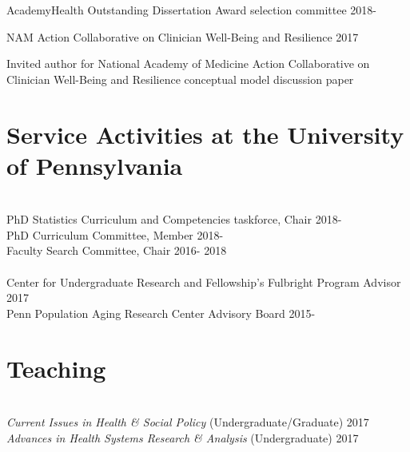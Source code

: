 \documentclass[10pt,]{article}
\begin{document}
{{{{{{{{{{{{{{{AcademyHealth Outstanding Dissertation Award selection committee \hfill {2018-{\small{}}}

NAM Action Collaborative on Clinician Well-Being and Resilience \hfill 2017
\vspace{-2.5mm}
\begin{adjustwidth}{0.5cm}{1cm}
Invited author for National Academy of Medicine Action Collaborative on Clinician Well-Being and Resilience conceptual model discussion paper
\end{adjustwidth}

\section{\Large \sc Service Activities at the University of Pennsylvania}
\vspace{-1mm}
\\
PhD Statistics Curriculum and Competencies taskforce, Chair \hfill {2018-{\small{}}}\\
PhD Curriculum Committee, Member \hfill {2018-{\small{}}}\\
Faculty Search Committee, Chair \hfill 2016- 2018\\

\vspace{2mm}
\\ 
Center for Undergraduate Research and Fellowship’s Fulbright Program Advisor \hfill 2017\\	
Penn Population Aging Research Center Advisory Board \hfill {2015-{\small{}}}\\

\section{\Large \sc Teaching}

 \\
{\textit{Current Issues in Health \& Social Policy} {\small{(Undergraduate/Graduate)}} \hfill 2017\\	
{\textit{Advances in Health Systems Research \& Analysis}} {\small{(Undergraduate)}} \hfill 2017\\

}}}}}}}}}}}}}}}}
\end{document}
